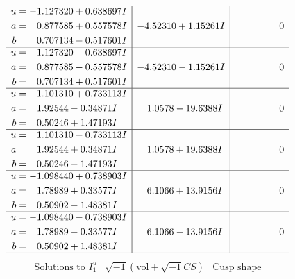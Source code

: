\documentclass[1p]{elsarticle_modified}
\theoremstyle{definition}
\newcommand{\I}{\sqrt{-1}}
\begin{document}
$$\begin{array}{c|c|c}
\begin{aligned}
u &= -1.127320 + 0.638697 I \\
a &= \phantom{-}0.877585 + 0.557578 I \\
b &= \phantom{-}0.707134 - 0.517601 I\end{aligned}
 & -4.52310 + 1.15261 I & \phantom{-0.000000 } 0 \\ \hline\begin{aligned}
u &= -1.127320 - 0.638697 I \\
a &= \phantom{-}0.877585 - 0.557578 I \\
b &= \phantom{-}0.707134 + 0.517601 I\end{aligned}
 & -4.52310 - 1.15261 I & \phantom{-0.000000 } 0 \\ \hline\begin{aligned}
u &= \phantom{-}1.101310 + 0.733113 I \\
a &= \phantom{-}1.92544 - 0.34871 I \\
b &= \phantom{-}0.50246 + 1.47193 I\end{aligned}
 & \phantom{-}1.0578 - 19.6388 I & \phantom{-0.000000 } 0 \\ \hline\begin{aligned}
u &= \phantom{-}1.101310 - 0.733113 I \\
a &= \phantom{-}1.92544 + 0.34871 I \\
b &= \phantom{-}0.50246 - 1.47193 I\end{aligned}
 & \phantom{-}1.0578 + 19.6388 I & \phantom{-0.000000 } 0 \\ \hline\begin{aligned}
u &= -1.098440 + 0.738903 I \\
a &= \phantom{-}1.78989 + 0.33577 I \\
b &= \phantom{-}0.50902 - 1.48381 I\end{aligned}
 & \phantom{-}6.1066 + 13.9156 I & \phantom{-0.000000 } 0 \\ \hline\begin{aligned}
u &= -1.098440 - 0.738903 I \\
a &= \phantom{-}1.78989 - 0.33577 I \\
b &= \phantom{-}0.50902 + 1.48381 I\end{aligned}
 & \phantom{-}6.1066 - 13.9156 I & \phantom{-0.000000 } 0\\
 \hline 
 \end{array}$$\newpage$$\begin{array}{c|c|c}  
\text{Solutions to }I^u_{1}& \I (\text{vol} + \sqrt{-1}CS) & \text{Cusp shape}\\

\end{array}$$
\end{document}
